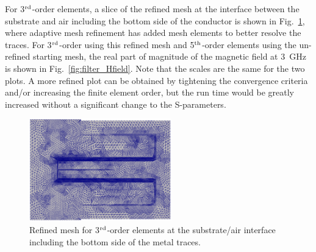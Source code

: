 \documentclass[titlepage]{article}
\renewcommand\_{\textunderscore\linebreak[1]}
\begin{document}
For 3$^{\textnormal{rd}}$-order elements, a slice of the refined mesh at the interface between the substrate and air including the bottom side of the conductor is shown in Fig.~\ref{fig:filter_refined_mesh}, where adaptive mesh refinement has added mesh elements to better resolve the traces.  For 3$^{\textnormal{rd}}$-order using this refined mesh and 5$^{\textnormal{th}}$-order elements using the un-refined starting mesh, the real part of magnitude of the magnetic field at 3~GHz is shown in Fig.~\ref{fig:filter_Hfield}.  Note that the scales are the same for the two plots.  A more refined plot can be obtained by tightening the convergence criteria and/or increasing the finite element order, but the run time would be greatly increased without a significant change to the S-parameters.
\begin{figure}[H]
  \centering
  \includegraphics[width=0.55\textwidth]{../regression/OpenParEM3D/microstrip/filter_study/screenshots/filter_refined_mesh}
  \caption{Refined mesh for 3$^{\textnormal{rd}}$-order elements at the substrate/air interface including the bottom side of the metal traces.}
  \label{fig:filter_refined_mesh}
\end{figure}
\end{document}
